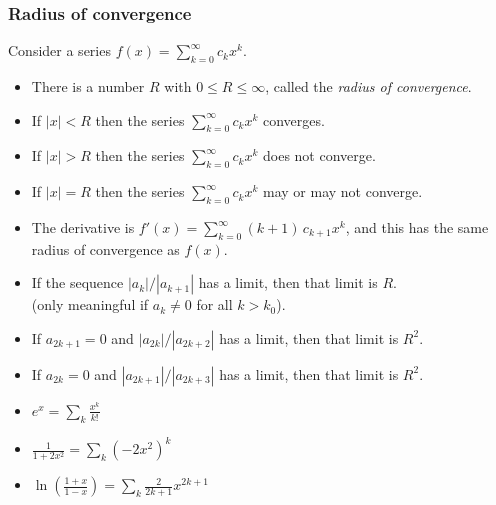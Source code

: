 \documentclass[9pt]{beamer}
\begin{document}
\begin{frame}[t]
 \frametitle{Radius of convergence}
 
 Consider a series $f(x)=\sum_{k=0}^\infty c_kx^k$.
 \begin{itemize}
  \item<2-> There is a number $R$ with $0\leq R\leq \infty$, called the \emph{radius of convergence}.
  \item<3-> If $|x|<R$ then the series $\sum_{k=0}^\infty c_kx^k$ converges.
  \item<4-> If $|x|>R$ then the series $\sum_{k=0}^\infty c_kx^k$ does not converge.
  \item<5-> If $|x|=R$ then the series $\sum_{k=0}^\infty c_kx^k$ may or may not converge.
  \item<6-> The derivative is $f'(x)=\sum_{k=0}^\infty (k+1)\,c_{k+1}x^k$, and this has the
        same radius of convergence as $f(x)$.
 \end{itemize}

 \begin{itemize}
  \item< 8->[(a)] If the sequence $|a_k|/|a_{k+1}|$ has a limit, then that limit is $R$.\\
        (only meaningful if $a_k\neq 0$ for all $k>k_0$).
  \item< 9->[(b)] If $a_{2k+1}=0$ and $|a_{2k}|/|a_{2k+2}|$ has a limit, then that limit is $R^2$.\\
  \item<10->[(c)] If $a_{2k}=0$ and $|a_{2k+1}|/|a_{2k+3}|$ has a limit, then that limit is $R^2$.
 \end{itemize}

 \begin{itemize}
  \item<12->[(a)] $e^x=\sum_k\frac{x^k}{k!}$
  \item<16->[(b)] $\frac{1}{1+2x^2}=\sum_k(-2x^2)^k$
  \item<21->[(c)] $\ln\left(\frac{1+x}{1-x}\right)=\sum_k\frac{2}{2k+1}x^{2k+1}$
 \end{itemize}
\end{frame}
\end{document}
